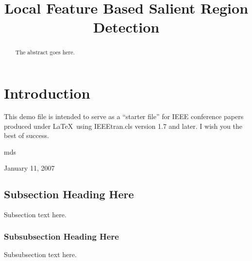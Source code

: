 \documentclass[conference]{IEEEtran}
\begin{document}
\title{Local Feature Based Salient Region Detection}
\author{
}
\maketitle


\begin{abstract}

The abstract goes here.

\end{abstract}


\IEEEpeerreviewmaketitle


\section{Introduction}

This demo file is intended to serve as a ``starter file''
for IEEE conference papers produced under \LaTeX\ using
IEEEtran.cls version 1.7 and later.
I wish you the best of success.

\hfill mds
 
\hfill January 11, 2007

\subsection{Subsection Heading Here}

Subsection text here.


\subsubsection{Subsubsection Heading Here}

Subsubsection text here.


%
%
\end{document}
